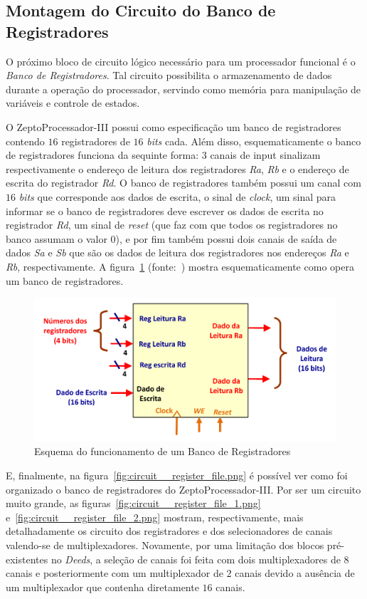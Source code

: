 \documentclass[12pt]{article}
\begin{document}
\subsection{Montagem do Circuito do Banco de Registradores}\label{sec:2.3}

O próximo bloco de circuito lógico necessário para um processador funcional é o
\emph{Banco de Registradores}. Tal circuito possibilita o armazenamento de dados
durante a operação do processador, servindo como memória para manipulação de
variáveis e controle de estados.

O ZeptoProcessador-III possui como especificação um banco de registradores
contendo $16$ registradores de $16$ \emph{bits} cada. Além disso,
esquematicamente o banco de registradores funciona da sequinte forma: $3$ canais
de input sinalizam respectivamente o endereço de leitura dos registradores
\emph{Ra}, \emph{Rb} e o endereço de escrita do registrador \emph{Rd}. O banco
de registradores também possui um canal com $16$ \emph{bits} que corresponde aos
dados de escrita, o sinal de \emph{clock}, um sinal para informar se o banco de
registradores deve escrever os dados de escrita no registrador \emph{Rd}, um
sinal de \emph{reset} (que faz com que todos os registradores no banco assumam o
valor $0$), e por fim também possui dois canais de saída de dados \emph{Sa} e
\emph{Sb} que são os dados de leitura dos registradores nos endereços \emph{Ra}
e \emph{Rb}, respectivamente. A figura~\ref{fig:diagram__register_file.png}
(fonte:~\cite{Diagram_Register_file}) mostra esquematicamente como opera um
banco de registradores.

\begin{figure}[H]
    \centering
    \includegraphics[width=.9\textwidth]{Projeto/images/diagram__register_file.png}
    \caption{Esquema do funcionamento de um Banco de Registradores}\label{fig:diagram__register_file.png}
\end{figure}

E, finalmente, na figura~\ref{fig:circuit__register_file.png} é possível ver
como foi organizado o banco de registradores do ZeptoProcessador-III. Por ser um
circuito muito grande, as figuras~\ref{fig:circuit__register_file_1.png}
e~\ref{fig:circuit__register_file_2.png} mostram, respectivamente, mais
detalhadamente os circuito dos registradores e dos selecionadores de canais
valendo-se de multiplexadores. Novamente, por uma limitação dos blocos
pré-existentes no \emph{Deeds}, a seleção de canais foi feita com dois
multiplexadores de $8$ canais e posteriormente com um multiplexador de $2$
canais devido a ausência de um multiplexador que contenha diretamente $16$
canais.
\end{document}

